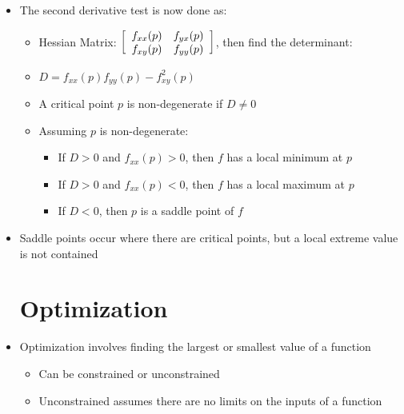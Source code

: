 \begin{itemize}
  \item The second derivative test is now done as:

    \begin{itemize}

      \item Hessian Matrix: $\left[ \begin{array}{c c} f_{xx}(p) & f_{yx}(p)\\ f_{xy}(p) & f_{yy}(p)  \end{array} \right]$, then find the determinant:

      \item $D=f_{xx}(p)f_{yy}(p)-f_{xy}^2(p)$

      \item A critical point $p$ is non-degenerate if $D\neq0$

      \item Assuming $p$ is non-degenerate:

        \begin{itemize}

          \item If $D > 0$ and $f_{xx}(p) > 0$, then $f$ has a local minimum at $p$

          \item If $D > 0$ and $f_{xx}(p) < 0$, then $f$ has a local maximum at $p$

          \item If $D < 0$, then $p$ is a saddle point of $f$

        \end{itemize}

    \end{itemize}

  \item Saddle points occur where there are critical points, but a local extreme value is not contained

    \section{Optimization}

  \item Optimization involves finding the largest or smallest value of a function

    \begin{itemize}

      \item Can be constrained or unconstrained

      \item Unconstrained assumes there are no limits on the inputs of a function


\end{itemize}
\end{itemize}
